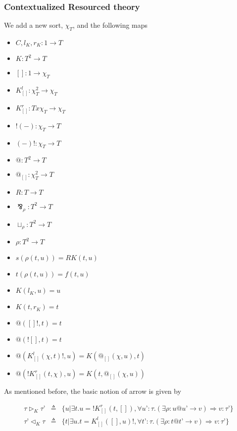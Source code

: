 \documentclass{llncs}
\renewcommand{\:}{\colon}
\begin{document}
\subsubsection{Contextualized Resourced theory}
We add a new sort, $\chi_{T}$, and the following maps

\begin{itemize}
  \item $C, l_{K}, r_{K} : 1 \rightarrow T$
  \item $K : T^{2} \rightarrow T$
  \item $[] : 1 \rightarrow \chi_{T}$
  \item $K_{[]}^{l} : \chi_{T}^{2} \rightarrow \chi_{T}$
  \item $K_{[]}^{r} : T x \chi_{T} \rightarrow \chi_{T}$
  \item $!(-) : \chi_{T}  \rightarrow T$
  \item $(-)! : \chi_{T}  \rightarrow T$
  \item $@ : T^{2} \rightarrow T$
  \item $@_{[]} : \chi_{T}^{2} \rightarrow T$
  \item $R : T \rightarrow T$
  \item $\bindnasrepma_{\rho} : T^{2} \rightarrow T$
  \item $\sqcup_{\rho} : T^{2} \rightarrow T$
  \item $\rho : T^{2} \rightarrow T$             %
  \item $s(\rho(t,u)) = RK(t, u)$ 
  \item $t(\rho(t,u)) = f(t,u)$          %
  \item $K(l_{K}, u) = u$
  \item $K(t, r_{K}) = t$
  \item $@([]!,t) = t$
  \item $@(![],t) = t$
  \item $@(K_{[]}^{l} (\chi, t)!, u) = K(@_{[]}(\chi, u), t)$
  \item  $@(!K_{[]}^{r} (t, \chi), u) = K(t, @_{[]}(\chi, u))$
\end{itemize}

As mentioned before, the basic notion of arrow is given by

\begin{eqnarray*}
  \tau \rhd_{K} \tau’ & \triangleq  & \{ u | \exists t. u = !K_{[]}^{r}(t, []),\forall u’:\tau. (\exists \rho : u@u’\rightarrow v) \Rightarrow v:\tau’ \} \\
  \tau’\lhd_{K} \tau & \triangleq  & \{ t | \exists u. t = K_{[]}^{l}([], u)!,\forall t’:\tau. (\exists \rho : t@t’\rightarrow v) \Rightarrow v:\tau’\}
\end{eqnarray*}
\end{document}
